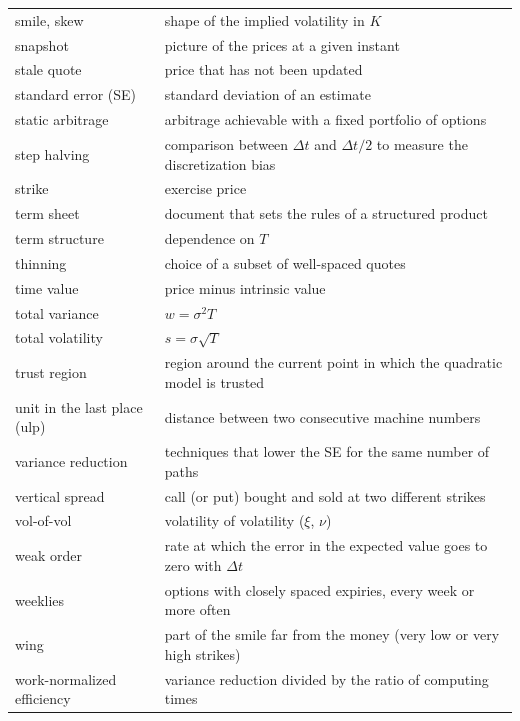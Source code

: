 \begin{small}
\begin{longtable}{@{}>{\raggedright\arraybackslash}p{}%
  >{\raggedright\arraybackslash}p{}@{}}
smile, skew & shape of the implied volatility in $K$\\
snapshot & picture of the prices at a given instant\\
stale quote & price that has not been updated\\
standard error (SE) & standard deviation of an estimate\\
static arbitrage & arbitrage achievable with a fixed portfolio of options\\
step halving & comparison between $\Delta t$ and $\Delta t/2$ to measure the discretization bias\\
strike & exercise price\\
term sheet & document that sets the rules of a structured product\\
term structure & dependence on $T$\\
thinning & choice of a subset of well-spaced quotes\\
time value & price minus intrinsic value\\
total variance & $w=\sigma^2T$\\
total volatility & $s=\sigma\sqrt T$\\
trust region & region around the current point in which the quadratic model is trusted\\
unit in the last place (ulp) & distance between two consecutive machine numbers\\
variance reduction & techniques that lower the SE for the same number of paths\\
vertical spread & call (or put) bought and sold at two different strikes\\
vol-of-vol & volatility of volatility ($\xi$, $\nu$)\\
weak order & rate at which the error in the expected value goes to zero with $\Delta t$\\
weeklies & options with closely spaced expiries, every week or more often\\
wing & part of the smile far from the money (very low or very high strikes)\\
work-normalized efficiency & variance reduction divided by the ratio of computing times\\
\end{longtable}
\end{small}
